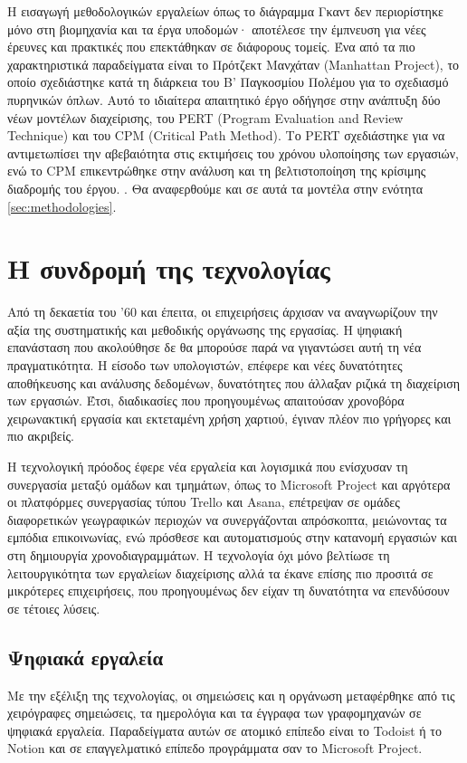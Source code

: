             Η εισαγωγή μεθοδολογικών εργαλείων όπως το διάγραμμα Γκαντ δεν περιορίστηκε μόνο στη βιομηχανία και τα έργα υποδομών· αποτέλεσε την έμπνευση για νέες έρευνες και πρακτικές που επεκτάθηκαν σε διάφορους τομείς. Ένα από τα πιο χαρακτηριστικά παραδείγματα είναι το Πρότζεκτ Μανχάταν (Manhattan Project), το οποίο σχεδιάστηκε κατά τη διάρκεια του Β' Παγκοσμίου Πολέμου για το σχεδιασμό πυρηνικών όπλων. Αυτό το ιδιαίτερα απαιτητικό έργο οδήγησε στην ανάπτυξη δύο νέων μοντέλων διαχείρισης, του PERT (Program Evaluation and Review Technique) και του CPM (Critical Path Method). Το PERT σχεδιάστηκε για να αντιμετωπίσει την αβεβαιότητα στις εκτιμήσεις του χρόνου υλοποίησης των εργασιών, ενώ το CPM επικεντρώθηκε στην ανάλυση και τη βελτιστοποίηση της κρίσιμης διαδρομής του έργου. \cite{SaylorAcademyProjectManagement}. Θα αναφερθούμε και σε αυτά τα μοντέλα στην ενότητα \ref{sec:methodologies}.


    \section{Η συνδρομή της τεχνολογίας}
        Από τη δεκαετία του '60 και έπειτα, οι επιχειρήσεις άρχισαν να αναγνωρίζουν την αξία της συστηματικής και μεθοδικής οργάνωσης της εργασίας. Η ψηφιακή επανάσταση που ακολούθησε δε θα μπορούσε παρά να γιγαντώσει αυτή τη νέα πραγματικότητα. Η είσοδο των υπολογιστών, επέφερε και νέες δυνατότητες αποθήκευσης και ανάλυσης δεδομένων, δυνατότητες που άλλαξαν ριζικά τη διαχείριση των εργασιών. Έτσι, διαδικασίες που προηγουμένως απαιτούσαν χρονοβόρα χειρωνακτική εργασία και εκτεταμένη χρήση χαρτιού, έγιναν πλέον πιο γρήγορες και πιο ακριβείς.

        Η τεχνολογική πρόοδος έφερε νέα εργαλεία και λογισμικά που ενίσχυσαν τη συνεργασία μεταξύ ομάδων και τμημάτων, όπως το Microsoft Project και αργότερα οι πλατφόρμες συνεργασίας τύπου Trello και Asana, επέτρεψαν σε ομάδες διαφορετικών γεωγραφικών περιοχών να συνεργάζονται απρόσκοπτα, μειώνοντας τα εμπόδια επικοινωνίας, ενώ πρόσθεσε και αυτοματισμούς στην κατανομή εργασιών και στη δημιουργία χρονοδιαγραμμάτων. Η τεχνολογία όχι μόνο βελτίωσε τη λειτουργικότητα των εργαλείων διαχείρισης αλλά τα έκανε επίσης πιο προσιτά σε μικρότερες επιχειρήσεις, που προηγουμένως δεν είχαν τη δυνατότητα να επενδύσουν σε τέτοιες λύσεις.

        \subsection{Ψηφιακά εργαλεία} \label{sec:digitaltools}
            Με την εξέλιξη της τεχνολογίας, οι σημειώσεις και η οργάνωση μεταφέρθηκε από τις χειρόγραφες σημειώσεις, τα ημερολόγια και τα έγγραφα των γραφομηχανών σε  ψηφιακά εργαλεία. Παραδείγματα αυτών σε ατομικό επίπεδο είναι το Todoist ή το Notion και σε επαγγελματικό επίπεδο προγράμματα σαν το Microsoft Project.

